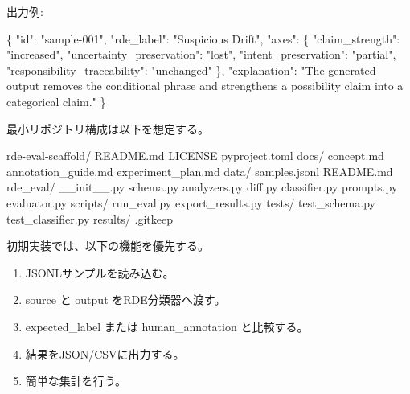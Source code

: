 \documentclass[
  a4paper]{ltjsarticle}
\newenvironment{Shaded}{}{}
\newcommand{\DataTypeTok}[1]{\textcolor[rgb]{0.56,0.13,0.00}{#1}}
\newcommand{\FunctionTok}[1]{\textcolor[rgb]{0.02,0.16,0.49}{#1}}
\newcommand{\NormalTok}[1]{#1}
\newcommand{\StringTok}[1]{\textcolor[rgb]{0.25,0.44,0.63}{#1}}
\providecommand{\tightlist}{%
  \setlength{\itemsep}{0pt}\setlength{\parskip}{0pt}}
\begin{document}
出力例:

\begin{Shaded}
\begin{Highlighting}[]
\FunctionTok{\{}
  \DataTypeTok{"id"}\FunctionTok{:} \StringTok{"sample{-}001"}\FunctionTok{,}
  \DataTypeTok{"rde\_label"}\FunctionTok{:} \StringTok{"Suspicious Drift"}\FunctionTok{,}
  \DataTypeTok{"axes"}\FunctionTok{:} \FunctionTok{\{}
    \DataTypeTok{"claim\_strength"}\FunctionTok{:} \StringTok{"increased"}\FunctionTok{,}
    \DataTypeTok{"uncertainty\_preservation"}\FunctionTok{:} \StringTok{"lost"}\FunctionTok{,}
    \DataTypeTok{"intent\_preservation"}\FunctionTok{:} \StringTok{"partial"}\FunctionTok{,}
    \DataTypeTok{"responsibility\_traceability"}\FunctionTok{:} \StringTok{"unchanged"}
  \FunctionTok{\},}
  \DataTypeTok{"explanation"}\FunctionTok{:} \StringTok{"The generated output removes the conditional phrase and strengthens a possibility claim into a categorical claim."}
\FunctionTok{\}}
\end{Highlighting}
\end{Shaded}

最小リポジトリ構成は以下を想定する。

\begin{Shaded}
\begin{Highlighting}[]
\NormalTok{rde{-}eval{-}scaffold/}
\NormalTok{  README.md}
\NormalTok{  LICENSE}
\NormalTok{  pyproject.toml}
\NormalTok{  docs/}
\NormalTok{    concept.md}
\NormalTok{    annotation\_guide.md}
\NormalTok{    experiment\_plan.md}
\NormalTok{  data/}
\NormalTok{    samples.jsonl}
\NormalTok{    README.md}
\NormalTok{  rde\_eval/}
\NormalTok{    \_\_init\_\_.py}
\NormalTok{    schema.py}
\NormalTok{    analyzers.py}
\NormalTok{    diff.py}
\NormalTok{    classifier.py}
\NormalTok{    prompts.py}
\NormalTok{    evaluator.py}
\NormalTok{  scripts/}
\NormalTok{    run\_eval.py}
\NormalTok{    export\_results.py}
\NormalTok{  tests/}
\NormalTok{    test\_schema.py}
\NormalTok{    test\_classifier.py}
\NormalTok{  results/}
\NormalTok{    .gitkeep}
\end{Highlighting}
\end{Shaded}

初期実装では、以下の機能を優先する。

\begin{enumerate}
\def\labelenumi{\arabic{enumi}.}
\tightlist
\item
  JSONLサンプルを読み込む。
\item
  source と output をRDE分類器へ渡す。
\item
  expected\_label または human\_annotation と比較する。
\item
  結果をJSON/CSVに出力する。
\item
  簡単な集計を行う。
\end{enumerate}
\end{document}

